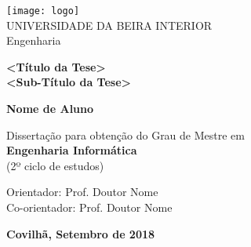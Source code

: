 \begin{titlepage}
\begin{center}

\begin{flushleft}
 \texttt{[image: logo]}\\
\rostoubi UNIVERSIDADE DA BEIRA INTERIOR\\
\rostofac Engenharia\\
\end{flushleft}

\vspace{7.6cm}

\rostotitulo \textbf{<Título da Tese>} \\
\rostosubtit \textbf{<Sub-Título da Tese>}\\

\vspace{1.8cm}

\rostonomes \textbf{Nome de Aluno}\\

\vspace{1.4cm}

\rostooutros Dissertação para obtenção do Grau de Mestre em\\
\rostonomes \textbf{Engenharia Informática}\\
\rostooutros (2º ciclo de estudos)\\

\vspace{3.3cm}

\rostooutros Orientador: Prof. Doutor Nome\\
Co-orientador: Prof. Doutor Nome\\

\vspace{1.4cm}

\rostooutros \textbf{Covilhã, Setembro de 2018}

\end{center}
\end{titlepage}

